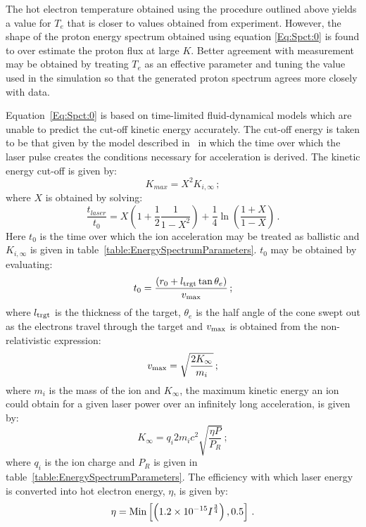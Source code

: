 The hot electron temperature obtained using the procedure outlined
above yields a value for $T_e$ that is closer to values obtained from
experiment.
However, the shape of the proton energy spectrum obtained using
equation \ref{Eq:Spct:0} is found to over estimate the proton flux at
large $K$.
Better agreement with measurement may be obtained by treating $T_e$ as
an effective parameter and tuning the value used in the simulation so
that the generated proton spectrum agrees more closely with data.

Equation~\ref{Eq:Spct:0} is based on time-limited fluid-dynamical
models which are unable to predict the cut-off kinetic energy
accurately. 
The cut-off energy is taken to be that given by the model described
in~\cite{10.1103/PhysRevLett.97.045005} in which the time over which
the laser pulse creates the conditions necessary for acceleration is
derived.
The kinetic energy cut-off is given by:
\begin{equation}
  K_{max} = X^{2} K_{i,\infty} \, ;
  \label{eq:Eq:Spct:2}
\end{equation}
where $X$ is obtained by solving:
\begin{equation}
  \frac{t_{laser}}{t_{0}} = X \left( 1 + \frac{1}{2}
                           \frac{1}{1 - X^{2}} \right) +
                           \frac{1}{4} \ln \left( \frac{1+X}{1-X} \right) \, .
  \label{eq:Eq:Spct:1}
\end{equation}
Here $t_0$ is the time over which the ion acceleration may be treated
as ballistic and $K_{i,\infty}$ is given in
table~\ref{table:EnergySpectrumParameters}.
$t_0$ may be obtained by evaluating:
\begin{equation}
  t_0 = \frac{\left( r_0 + l_{\rm trgt} \tan\theta_e \right)}
             {v_{\rm max}} \, ;
\end{equation}
where $l_{\rm trgt}$ is the thickness of the target, $\theta_e$ is the
half angle of the cone swept out as the electrons travel through the
target and $v_{\rm max}$ is obtained from the non-relativistic
expression:
\begin{equation}
  v_{\rm max} = \sqrt{ \frac{2 K_\infty}{m_i} } \, ;
\end{equation}
where $m_i$ is the mass of the ion and $K_\infty$, the maximum kinetic
energy an ion could obtain for a given laser power over an infinitely
long acceleration, is given by:
\begin{equation}
  K_\infty = q_i 2m_i c^2 \sqrt{\frac{\eta P}{P_R}} \, ;
\end{equation}
where $q_i$ is the ion charge and $P_R$ is given in
table~\ref{table:EnergySpectrumParameters}.
The efficiency with which laser energy is converted into hot electron
energy, $\eta$, is given by:
\begin{equation}
  \eta = {\rm Min} \left[
                         \left( 1.2 \times 10^{-15} I^{\frac{3}{4}} \right) ,
                         0.5
                   \right] \, .
\end{equation}

